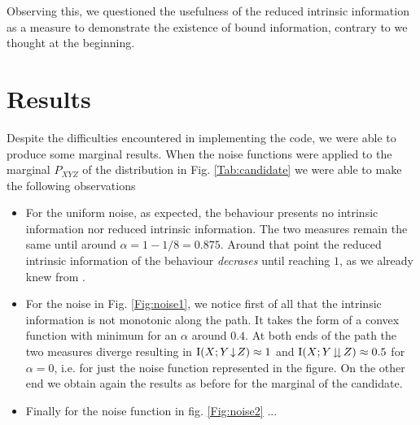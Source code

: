     Observing this, we questioned the usefulness of the reduced intrinsic information as a measure to demonstrate the existence of bound information, contrary to we thought at the beginning. 
    
\section{Results}
Despite the difficulties encountered in implementing the code, we were able to produce some marginal results.
When the noise functions were applied to the marginal $P_{XYZ}$ of the distribution in Fig. \ref{Tab:candidate} we were able to make the following observations
\begin{itemize}
\item For the uniform noise, as expected, the behaviour presents no intrinsic information nor reduced intrinsic information. The two measures remain the same until around $\alpha = 1- 1/8 = 0.875$. Around that point the reduced intrinsic information of the behaviour \textit{decrases} until reaching $1$, as we already knew from \cite{RW03}.

\item For the noise in Fig. \ref{Fig:noise1}, we notice first of all that the intrinsic information is not monotonic along the path. It takes the form of a convex function with minimum for an $\alpha$ around $0.4$. At both ends of the path the two measures diverge resulting in $\operatorname{I}(X;Y\!\downarrow\!Z) \approx 1$ and $\operatorname{I}(X;Y\!\downdownarrows\!Z) \approx 0.5$ for $\alpha = 0$, i.e. for just the noise function represented in the figure. On the other end we obtain again the results as before for the marginal of the candidate.

\item Finally for the noise function in fig. \ref{Fig:noise2} ... %
\end{itemize}

    
    